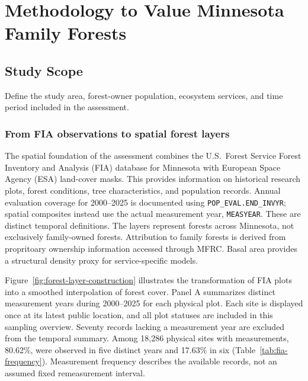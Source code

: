 \documentclass[11pt]{article}
\begin{document}
\section{Methodology to Value Minnesota Family Forests}

\subsection{Study Scope}
Define the study area, forest-owner population, ecosystem services, and time period included in the assessment.


\subsubsection{From FIA observations to spatial forest layers}

The spatial foundation of the assessment combines the U.S.\ Forest Service Forest Inventory and Analysis (FIA) database for Minnesota with European Space Agency (ESA) land-cover masks. This provides information on historical research plots, forest conditions, tree characteristics, and population records. Annual evaluation coverage for 2000--2025 is documented using \texttt{POP\_EVAL.END\_INVYR}; spatial composites instead use the actual measurement year, \texttt{MEASYEAR}. These are distinct temporal definitions. The layers represent forests across Minnesota, not exclusively family-owned forests. Attribution to family forests is derived from propritoary ownership information accessed through MFRC. Basal area provides a structural density proxy for service-specific models.

Figure~\ref{fig:forest-layer-construction} illustrates the transformation of FIA plots into a smoothed interpolation of forest cover. Panel A summarizes distinct measurement years during 2000--2025 for each physical plot.
Each site is displayed once at its latest public location, and all plot statuses are included in this sampling overview. Seventy records lacking a measurement year are excluded from the temporal summary. Among 18,286 physical sites with measurements, 80.62\%, were observed in five distinct years and 17.63\% in six (Table~\ref{tab:fia-frequency}). Measurement frequency describes the available records, not an assumed fixed remeasurement interval.
\end{document}
